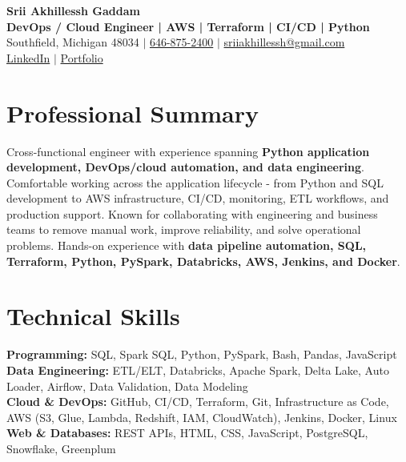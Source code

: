 \documentclass[letterpaper,10pt]{article}
\begin{document}
\fontsize{9.35pt}{10.45pt}\selectfont

\begin{center}
    {\LARGE \textbf{Srii Akhillessh Gaddam}} \\[-1pt]
    \textbf{DevOps / Cloud Engineer | AWS | Terraform | CI/CD | Python} \\[2pt]
    Southfield, Michigan 48034 $|$
    \href{tel:6468752400}{646-875-2400} $|$
    \href{mailto:sriiakhillessh@gmail.com}{sriiakhillessh@gmail.com} \\[1pt]
    \href{https://www.linkedin.com/in/srii-akhiilessh-gaddam-b48668191/}{LinkedIn} $|$
    \href{https://sriiakhillesshg.github.io/portfolio/}{Portfolio}
\end{center}
\vspace{-8pt}

\section{Professional Summary}
\small{Cross-functional engineer with experience spanning \textbf{Python application development, DevOps/cloud automation, and data engineering}. Comfortable working across the application lifecycle - from Python and SQL development to AWS infrastructure, CI/CD, monitoring, ETL workflows, and production support. Known for collaborating with engineering and business teams to remove manual work, improve reliability, and solve operational problems. Hands-on experience with \textbf{data pipeline automation, SQL, Terraform, Python, PySpark, Databricks, AWS, Jenkins, and Docker}.}

\section{Technical Skills}
\small{
\textbf{Programming:} SQL, Spark SQL, Python, PySpark, Bash, Pandas, JavaScript \\
\textbf{Data Engineering:} ETL/ELT, Databricks, Apache Spark, Delta Lake, Auto Loader, Airflow, Data Validation, Data Modeling \\
\textbf{Cloud \& DevOps:} GitHub, CI/CD, Terraform, Git, Infrastructure as Code, AWS (S3, Glue, Lambda, Redshift, IAM, CloudWatch), Jenkins, Docker, Linux \\
\textbf{Web \& Databases:} REST APIs, HTML, CSS, JavaScript, PostgreSQL, Snowflake, Greenplum
}
\end{document}

